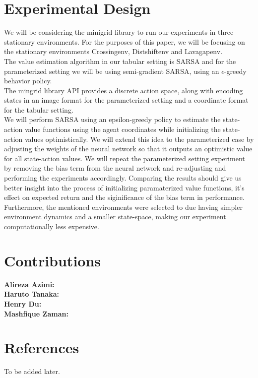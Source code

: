 \documentclass{article}
\theoremstyle{plain}
\theoremstyle{definition}
\theoremstyle{remark}
\begin{document}
\section{Experimental Design}
We will be considering the minigrid library to run our experiments in three stationary environments. For the purposes of this paper, we will be focusing on the stationary environments
Crossingenv, Distshiftenv and Lavagapenv.\\
The value estimation algorithm in our tabular setting is SARSA and for the parameterized setting we will be using
semi-gradient SARSA, using an $\epsilon$-greedy behavior policy.\\
The mingrid library API provides a discrete action space, along with encoding states in an image format for the 
parameterized setting and a coordinate format for the tabular setting.\\
We will perform SARSA using an epsilon-greedy policy to estimate the state-action value functions using the agent coordinates while initializing the state-action 
values optimistically. We will extend this idea to the parameterized case by adjusting the weights of the neural
network so that it outputs an optimistic value for all state-action values. We will repeat the parameterized
setting experiment by removing the bias term from the neural network and re-adjusting and performing the experiments accordingly.
Comparing the results should give us better insight into the process of initializing paramaterized value functions, it's effect on 
expected return and the siginificance of the bias term in performance.\\
Furthermore, the mentioned environments were selected to due having simpler environment dynamics and a smaller state-space, making our experiment computationally less expensive.


\section{Contributions}
\textbf{Alireza Azimi:}\\
\textbf{Haruto Tanaka:}\\
\textbf{Henry Du:}\\
\textbf{Mashfique Zaman:}\\

\section{References}
To be added later.
\nocite{langley00}



\end{document}
